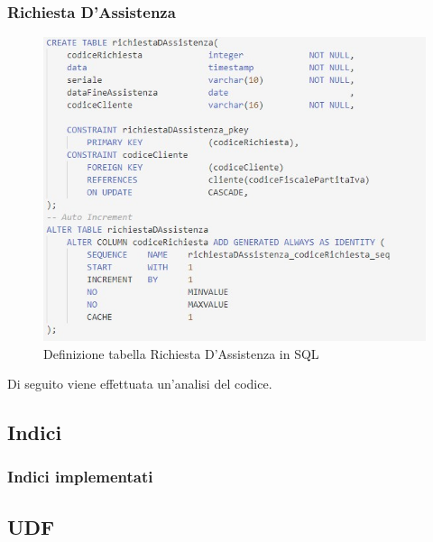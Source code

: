 \documentclass[legalpaper]{article}
\begin{document}
	\subsubsection{Richiesta D'Assistenza}
		\begin{figure}[h]
			\centering
			\includegraphics[width=0.9\linewidth]{Immagini SQL/richiestaDAssistenza}
			\caption{Definizione tabella Richiesta D'Assistenza in SQL}
			\label{richiestaDAssistenzasql}
		\end{figure}
		Di seguito viene effettuata un'analisi del codice. \\

\newpage		
\subsection{Indici}
\subsubsection{Indici implementati}
\newpage
\subsection{UDF}
\end{document}
